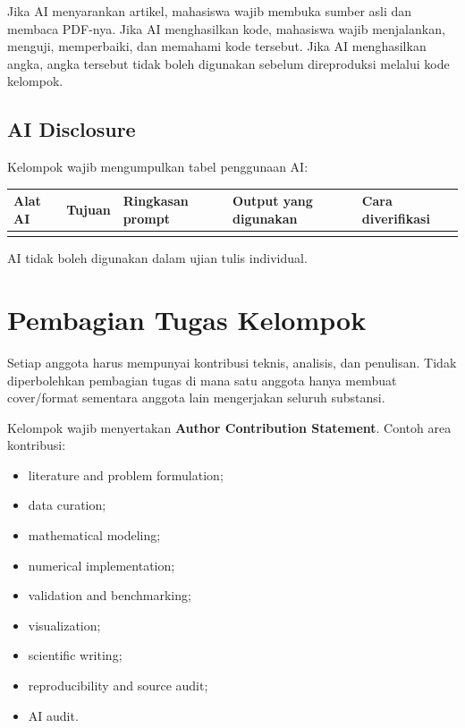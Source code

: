 \documentclass[11pt,a4paper]{article}
\begin{document}
Jika AI menyarankan artikel, mahasiswa wajib membuka sumber asli dan membaca PDF-nya. Jika AI menghasilkan kode, mahasiswa wajib menjalankan, menguji, memperbaiki, dan memahami kode tersebut. Jika AI menghasilkan angka, angka tersebut tidak boleh digunakan sebelum direproduksi melalui kode kelompok.

\subsection{AI Disclosure}

Kelompok wajib mengumpulkan tabel penggunaan AI:

\begin{center}
\begin{tabularx}{\textwidth}{Y Y Y Y Y}
\toprule
\textbf{Alat AI} & \textbf{Tujuan} & \textbf{Ringkasan prompt} & \textbf{Output yang digunakan} & \textbf{Cara diverifikasi} \\
\midrule
 & & & & \\
\bottomrule
\end{tabularx}
\end{center}

AI tidak boleh digunakan dalam ujian tulis individual.

\section{Pembagian Tugas Kelompok}

Setiap anggota harus mempunyai kontribusi teknis, analisis, dan penulisan. Tidak diperbolehkan pembagian tugas di mana satu anggota hanya membuat cover/format sementara anggota lain mengerjakan seluruh substansi.

Kelompok wajib menyertakan \textbf{Author Contribution Statement}. Contoh area kontribusi:
\begin{itemize}
    \item literature and problem formulation;
    \item data curation;
    \item mathematical modeling;
    \item numerical implementation;
    \item validation and benchmarking;
    \item visualization;
    \item scientific writing;
    \item reproducibility and source audit;
    \item AI audit.
\end{itemize}
\end{document}
